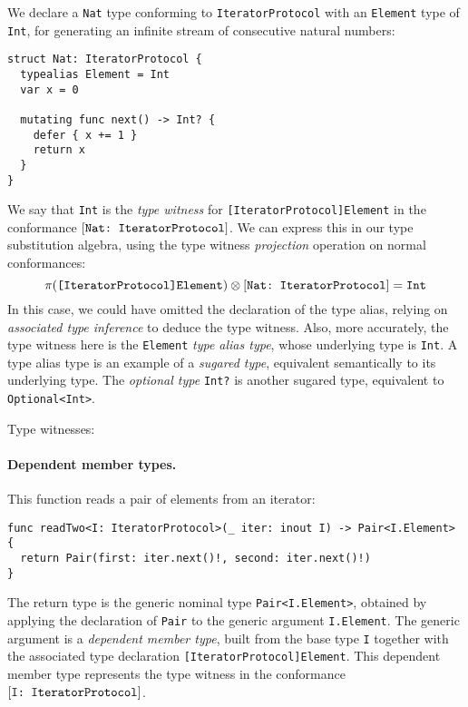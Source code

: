\documentclass[../generics]{subfiles}
\begin{document}
We declare a \texttt{Nat} type conforming to \texttt{IteratorProtocol} with an \texttt{Element} type of \texttt{Int}, for generating an infinite stream of consecutive natural numbers:
\begin{Verbatim}
struct Nat: IteratorProtocol {
  typealias Element = Int
  var x = 0
  
  mutating func next() -> Int? {
    defer { x += 1 }
    return x
  }
}
\end{Verbatim}
We say that \texttt{Int} is the \emph{type witness} for \texttt{[IteratorProtocol]Element} in the conformance $[\texttt{Nat:~IteratorProtocol}]$. We can express this in our type substitution algebra, using the type witness \emph{projection} operation on normal conformances:
\[\pi(\texttt{[IteratorProtocol]Element})\otimes [\texttt{Nat:~IteratorProtocol}] = \texttt{Int}\]
In this case, we could have omitted the declaration of the type alias, relying on \emph{associated type inference} to deduce the type witness. Also, more accurately, the type witness here is the \texttt{Element} \emph{type alias type}, whose underlying type is \texttt{Int}. A type alias type is an example of a \emph{sugared type}, equivalent semantically to its underlying type. The \emph{optional type} \texttt{Int?} is another sugared type, equivalent to \texttt{Optional<Int>}.

\begin{MoreDetails}
\item Type witnesses: 
\end{MoreDetails}

\paragraph{Dependent member types.} This function reads a pair of elements from an iterator:
\begin{Verbatim}
func readTwo<I: IteratorProtocol>(_ iter: inout I) -> Pair<I.Element> {
  return Pair(first: iter.next()!, second: iter.next()!)
}
\end{Verbatim}
The return type is the generic nominal type \texttt{Pair<I.Element>}, obtained by applying the declaration of \texttt{Pair} to the generic argument \texttt{I.Element}. The generic argument is a \emph{dependent member type}, built from the base type \texttt{I} together with the associated type declaration \texttt{[IteratorProtocol]Element}. This dependent member type represents the type witness in the conformance $[\texttt{I:~IteratorProtocol}]$.
\end{document}
